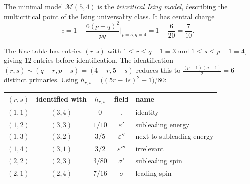 The minimal model $\mathcal{M}(5,4)$ is the \emph{tricritical Ising model}, describing
the multicritical point of the Ising universality class.  It has central charge
\begin{equation}\label{eq:c-5-4}
c = 1 - \frac{6(p-q)^2}{pq}\bigg|_{p=5,q=4} = 1 - \frac{6}{20} = \frac{7}{10}.
\end{equation}

\begin{computation}\label{comp:m54-primaries}
The Kac table has entries $(r,s)$ with $1 \leq r \leq q{-}1 = 3$ and
$1 \leq s \leq p{-}1 = 4$, giving $12$ entries before identification.
The identification $(r,s) \sim (q{-}r, p{-}s) = (4{-}r, 5{-}s)$ reduces this
to $\frac{(p-1)(q-1)}{2} = 6$ distinct primaries.
Using $h_{r,s} = \bigl((5r - 4s)^2 - 1\bigr)/80$:
\begin{center}
\renewcommand{\arraystretch}{1.2}
\begin{tabular}{ccccl}
\hline
$(r,s)$ & identified with & $h_{r,s}$ & field & name \\
\hline
$(1,1)$ & $(3,4)$ & $0$ & $\mathbb{I}$ & identity \\
$(1,2)$ & $(3,3)$ & $1/10$ & $\varepsilon'$ & subleading energy \\
$(1,3)$ & $(3,2)$ & $3/5$ & $\varepsilon''$ & next-to-subleading energy \\
$(1,4)$ & $(3,1)$ & $3/2$ & $\varepsilon'''$ & irrelevant \\
$(2,2)$ & $(2,3)$ & $3/80$ & $\sigma'$ & subleading spin \\
$(2,1)$ & $(2,4)$ & $7/16$ & $\sigma$ & leading spin \\
\hline
\end{tabular}
\end{center}
\end{computation}

